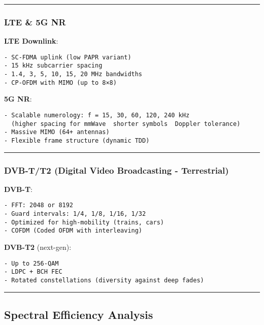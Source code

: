 \begin{center}\rule{0.5\linewidth}{0.5pt}\end{center}

\subsubsection{LTE \& 5G NR}\label{lte-5g-nr}

\textbf{LTE Downlink}:

\begin{verbatim}
- SC-FDMA uplink (low PAPR variant)
- 15 kHz subcarrier spacing
- 1.4, 3, 5, 10, 15, 20 MHz bandwidths
- CP-OFDM with MIMO (up to 8×8)
\end{verbatim}

\textbf{5G NR}:

\begin{verbatim}
- Scalable numerology: f = 15, 30, 60, 120, 240 kHz
  (higher spacing for mmWave  shorter symbols  Doppler tolerance)
- Massive MIMO (64+ antennas)
- Flexible frame structure (dynamic TDD)
\end{verbatim}

\begin{center}\rule{0.5\linewidth}{0.5pt}\end{center}

\subsubsection{DVB-T/T2 (Digital Video Broadcasting -
Terrestrial)}\label{dvb-tt2-digital-video-broadcasting---terrestrial}

\textbf{DVB-T}:

\begin{verbatim}
- FFT: 2048 or 8192
- Guard intervals: 1/4, 1/8, 1/16, 1/32
- Optimized for high-mobility (trains, cars)
- COFDM (Coded OFDM with interleaving)
\end{verbatim}

\textbf{DVB-T2} (next-gen):

\begin{verbatim}
- Up to 256-QAM
- LDPC + BCH FEC
- Rotated constellations (diversity against deep fades)
\end{verbatim}

\begin{center}\rule{0.5\linewidth}{0.5pt}\end{center}

\subsection{\texorpdfstring{ Spectral Efficiency
Analysis}{ Spectral Efficiency Analysis}}\label{spectral-efficiency-analysis}

